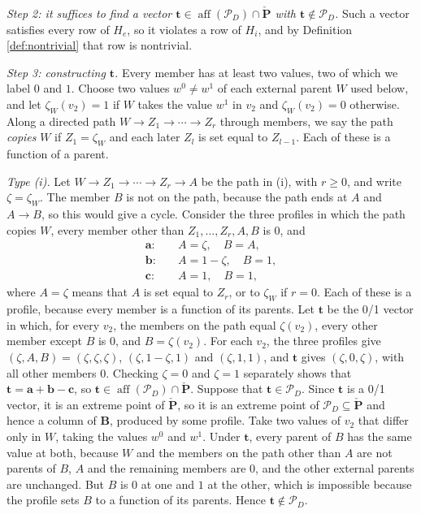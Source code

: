 \documentclass[12pt]{article}
\begin{document}
\emph{Step 2: it suffices to find a vector $\boldsymbol{t} \in \operatorname{aff}(\mathcal{P}_D) \cap \boldsymbol{\check{P}}$ with $\boldsymbol{t} \notin \mathcal{P}_D$.} Such a vector satisfies every row of $H_e$, so it violates a row of $H_i$, and by Definition \ref{def:nontrivial} that row is nontrivial.

\emph{Step 3: constructing $\boldsymbol{t}$.} Every member has at least two values, two of which we label $0$ and $1$. Choose two values $w^0 \neq w^1$ of each external parent $W$ used below, and let $\zeta_W(v_2) = 1$ if $W$ takes the value $w^1$ in $v_2$ and $\zeta_W(v_2) = 0$ otherwise. Along a directed path $W \rightarrow Z_1 \rightarrow \cdots \rightarrow Z_r$ through members, we say the path \emph{copies} $W$ if $Z_1 = \zeta_W$ and each later $Z_l$ is set equal to $Z_{l-1}$. Each of these is a function of a parent.

\emph{Type (i).} Let $W \rightarrow Z_1 \rightarrow \cdots \rightarrow Z_r \rightarrow A$ be the path in (i), with $r \geq 0$, and write $\zeta = \zeta_W$. The member $B$ is not on the path, because the path ends at $A$ and $A \rightarrow B$, so this would give a cycle. Consider the three profiles in which the path copies $W$, every member other than $Z_1, \ldots, Z_r, A, B$ is $0$, and
\begin{align*}
\boldsymbol{a}:&\quad A = \zeta, \quad B = A, \\
\boldsymbol{b}:&\quad A = 1 - \zeta, \quad B = 1, \\
\boldsymbol{c}:&\quad A = 1, \quad B = 1,
\end{align*}
where $A = \zeta$ means that $A$ is set equal to $Z_r$, or to $\zeta_W$ if $r = 0$. Each of these is a profile, because every member is a function of its parents. Let $\boldsymbol{t}$ be the 0/1 vector in which, for every $v_2$, the members on the path equal $\zeta(v_2)$, every other member except $B$ is $0$, and $B = \zeta(v_2)$. For each $v_2$, the three profiles give $(\zeta, A, B) = (\zeta, \zeta, \zeta)$, $(\zeta, 1 - \zeta, 1)$ and $(\zeta, 1, 1)$, and $\boldsymbol{t}$ gives $(\zeta, 0, \zeta)$, with all other members $0$. Checking $\zeta = 0$ and $\zeta = 1$ separately shows that $\boldsymbol{t} = \boldsymbol{a} + \boldsymbol{b} - \boldsymbol{c}$, so $\boldsymbol{t} \in \operatorname{aff}(\mathcal{P}_D) \cap \boldsymbol{\check{P}}$. Suppose that $\boldsymbol{t} \in \mathcal{P}_D$. Since $\boldsymbol{t}$ is a 0/1 vector, it is an extreme point of $\boldsymbol{\check{P}}$, so it is an extreme point of $\mathcal{P}_D \subseteq \boldsymbol{\check{P}}$ and hence a column of $\boldsymbol{B}$, produced by some profile. Take two values of $v_2$ that differ only in $W$, taking the values $w^0$ and $w^1$. Under $\boldsymbol{t}$, every parent of $B$ has the same value at both, because $W$ and the members on the path other than $A$ are not parents of $B$, $A$ and the remaining members are $0$, and the other external parents are unchanged. But $B$ is $0$ at one and $1$ at the other, which is impossible because the profile sets $B$ to a function of its parents. Hence $\boldsymbol{t} \notin \mathcal{P}_D$.
\end{document}

